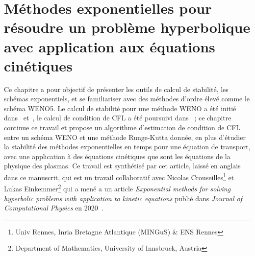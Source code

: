 \renewcommand{\localPath}{chap1}

\clearemptydoublepage
\chapter[Méthodes exponentielles appliquées aux équations cinétiques]{Méthodes exponentielles pour résoudre un problème hyperbolique avec application aux équations cinétiques}
\label{chap1}


Ce chapitre a pour objectif de présenter les outils de calcul de stabilité, les schémas exponentiels, et se familiariser avec des méthodes d'ordre élevé comme le schéma WENO5. Le calcul de stabilité pour une méthode WENO a été initié dans~\cite{Wang:2007} et~\cite{Motamed:2010}, le calcul de condition de CFL a été poursuivi dans~\cite{Lunet:2017} ; ce chapitre continue ce travail et propose un algorithme d'estimation de condition de CFL entre un schéma WENO et une méthode Runge-Kutta donnée, en plus d'étudier la stabilité des méthodes exponentielles en temps pour une équation de transport, avec une application à des équations cinétiques que sont les équations de la physique des plasmas. Ce travail est synthétisé par cet article, laissé en anglais dans ce manuscrit, qui est un travail collaboratif avec Nicolas Crouseilles\footnote{Univ Rennes, Inria Bretagne Atlantique (MINGuS) \& ENS Rennes} et Lukas Einkemmer\footnote{Department of Mathematics, University of Innsbruck, Austria} qui a mené a un article \emph{Exponential methods for solving hyperbolic problems with application to kinetic equations} publié dans \emph{Journal of Computational Physics} en 2020~\cite{Crouseilles:2019b}.

\begin{otherlanguage}{english} 

\end{otherlanguage}


